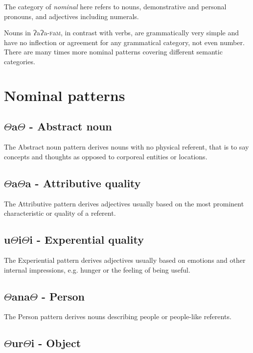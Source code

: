 \documentclass[a4paper,10pt,twoside,openright]{memoir}
\newcommand{\lang}{{\bigglot}a{\bigglot}a-\textsc{f}a\textsc{m}}
\newcommand{\rootpart}{$\Theta$}
\newcommand{\bigglot}{Ɂ}
\begin{document}
The category of \textit{nominal} here refers to nouns, demonstrative and personal pronouns, and adjectives including numerals.

Nouns in \lang{}, in contrast with verbs, are grammatically very simple and have no inflection or agreement for any grammatical category, not even number. There are many times more nominal patterns covering different semantic categories.

\section{Nominal patterns}


\subsection{\rootpart{}a\rootpart{} - Abstract noun}

The Abstract noun pattern derives nouns with no physical referent, that is to say concepts and thoughts as opposed to corporeal entities or locations.

\subsection{\rootpart{}a\rootpart{}a - Attributive quality}

The Attributive pattern derives adjectives usually based on the most prominent characteristic or quality of a referent.

\subsection{u\rootpart{}i\rootpart{}i - Experential quality}

The Experiential pattern derives adjectives usually based on emotions and other internal impressions, e.g. hunger or the feeling of being useful.

\subsection{\rootpart{}ana\rootpart{} - Person}

The Person pattern derives nouns describing people or people-like referents.

\subsection{\rootpart{}ur\rootpart{}i - Object}
\end{document}
